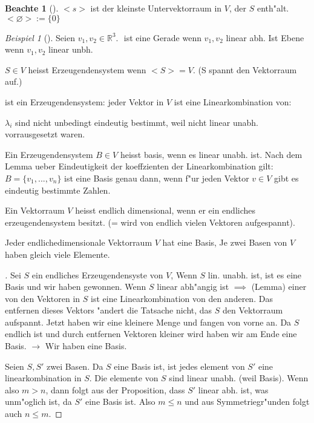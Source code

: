 \documentclass[11pt]{article}
\theoremstyle{remark}
\newtheorem{exa}{Beispiel}[section]
\theoremstyle{definition}
\newtheorem*{notte}{Beachte}
\theoremstyle{remark}
\begin{document}
\begin{notte}[] \label{}
\(<s>\) ist der kleinste Untervektorraum in \(V\), der \(S\) enth"alt. 
\(<\varnothing >:=\{0\}\)
\end{notte}

\begin{exa}[] \label{}
Seien \(v_1, v_2 \in \mathbb{R}^3\).
\(<v1,v2>\) ist eine Gerade wenn \(v_1,v_2\) linear abh. Ist Ebene wenn \(v_1,v_2\)
linear unbh.
\end{exa}

\begin{definition}{}{}
\(S\in V\) heisst Erzeugendensystem wenn \(<S>=V\). (S spannt den Vektorraum auf.)

ist ein Erzeugendensystem: jeder Vektor in \(V\) ist eine Linearkombination von:

\(\lambda_i\) sind nicht unbedingt eindeutig bestimmt, weil nicht linear unabh.
vorrausgesetzt waren.
\end{definition}

\begin{definition}{}{}
Ein Erzeugendensystem \(B\in V\) heisst basis, wenn es linear unabh. ist. Nach dem
Lemma ueber Eindeutigkeit der koeffzienten der Linearkombination gilt: \(B=\{v_1,
..., v_n\}\) ist eine Basis genau dann, wenn f"ur jeden Vektor \(v \in V\) gibt es
 eindeutig bestimmte Zahlen.
\end{definition}

\begin{definition}{}{}
Ein Vektorraum \(V\) heisst endlich dimensional, wenn er ein endliches
erzeugendensystem besitzt. (= wird von endlich vielen Vektoren aufgespannt).
\end{definition}

\begin{theo}{}{}
Jeder endlichedimensionale Vektorraum \(V\)  hat eine Basis, Je zwei Basen von \(V\)
haben gleich viele Elemente.
\end{theo}

\begin{proof}[] \label{}
Sei \(S\) ein endliches Erzeugendensyste von \(V\), Wenn \(S\) lin. unabh. ist, ist es
eine Basis und wir haben gewonnen. Wenn \(S\) linear abh"angig ist $\implies$
(Lemma) einer von den Vektoren in \(S\) ist eine Linearkombination von den
anderen. Das entfernen dieses Vektors "andert die Tatsache nicht, das \(S\) den
Vektorraum aufspannt. Jetzt haben wir eine kleinere Menge und fangen von vorne
an. Da \(S\) endlich ist und durch entfernen Vektoren kleiner wird haben wir am
Ende eine Basis.
\(\rightarrow\) Wir haben eine Basis.

Seien \(S, S'\) zwei Basen. Da \(S\) eine Basis ist, ist jedes element von \(S'\) eine
linearkombination in \(S\). Die elemente von \(S\) sind linear unabh. (weil Basis).
Wenn also \(m>n\), dann folgt aus der Proposition, dass \(S'\) linear abh. ist, was
unm"oglich ist, da \(S'\) eine Basis ist. Also \(m \leq n\) und aus Symmetriegr"unden folgt auch \(n \leq m\).
\end{proof}
\end{document}
